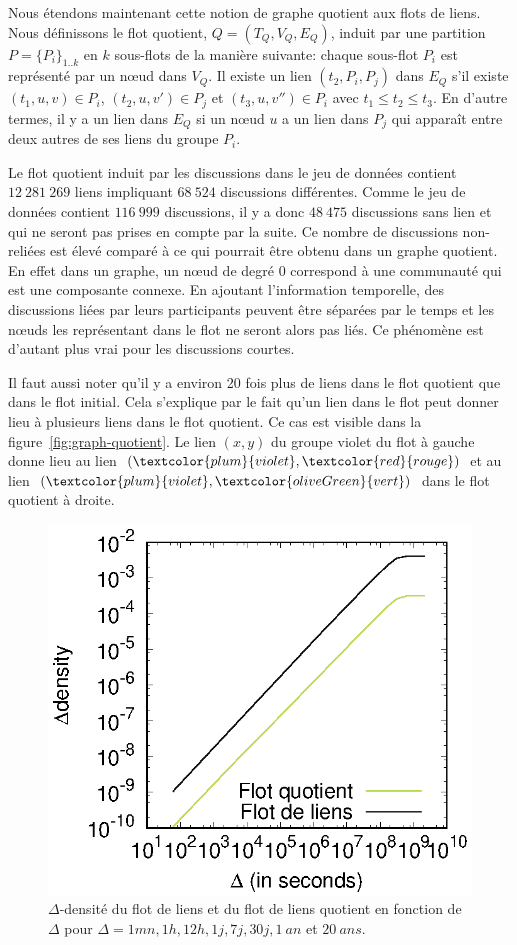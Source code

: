 Nous étendons maintenant cette notion de graphe quotient aux flots de liens.
Nous définissons le flot quotient, $Q=(T_Q,V_Q,E_Q)$, induit par une partition $P=\{{P_i}\}_{1..k}$ en $k$ sous-flots de la manière suivante: chaque sous-flot $P_i$ est représenté par un n\oe{}ud dans $V_Q$.
Il existe un lien $(t_2,P_i,P_j)$ dans $E_Q$ s'il existe $(t_1,u,v) \in P_i$, $(t_2,u,v') \in P_j$ et $(t_3,u,v'') \in P_i$ avec $t_1 \leq t_2 \leq t_3$.
En d'autre termes, il y a un lien dans $E_Q$ si un n\oe{}ud $u$ a un lien dans $P_j$ qui apparaît entre deux autres de ses liens du groupe $P_i$.

Le flot quotient induit par les discussions dans le jeu de données contient $12\ 281\ 269$ liens impliquant $68\ 524$ discussions différentes.
Comme le jeu de données contient $116\ 999$ discussions, il y a donc $48\ 475$ discussions sans lien et qui ne seront pas prises en compte par la suite.
Ce nombre de discussions non-reliées est élevé comparé à ce qui pourrait être obtenu dans un graphe quotient.
En effet dans un graphe, un n\oe{}ud de degré $0$ correspond à une communauté qui est une composante connexe.
En ajoutant l'information temporelle, des discussions liées par leurs participants peuvent être séparées par le temps et les n\oe{}uds les représentant dans le flot ne seront alors pas liés.
Ce phénomène est d'autant plus vrai pour les discussions courtes.



Il faut aussi noter qu'il y a environ 20 fois plus de liens dans le flot quotient que dans le flot initial.
Cela s'explique par le fait qu'un lien dans le flot peut donner lieu à plusieurs liens dans le flot quotient.
Ce cas est visible dans la figure~\ref{fig:graph-quotient}. 
Le lien $(x,y)$ du groupe violet du flot à gauche donne lieu au lien $(\textcolor{plum}{violet}, \textcolor{red}{rouge})$ et au lien $(\textcolor{plum}{violet}, \textcolor{oliveGreen}{vert})$ dans le flot quotient à droite. 

\begin{figure}
\centering
	\includegraphics[width=0.4\linewidth]{img/mailing/quotient-density}
	\caption{$\Delta$-densité du flot de liens et du flot de liens quotient en fonction de $\Delta$ pour $\Delta=1mn, 1h, 12h, 1j, 7j, 30j, 1\ an$ et $20\ ans$.}
	\label{fig:quotient-stream-density}
\end{figure}


